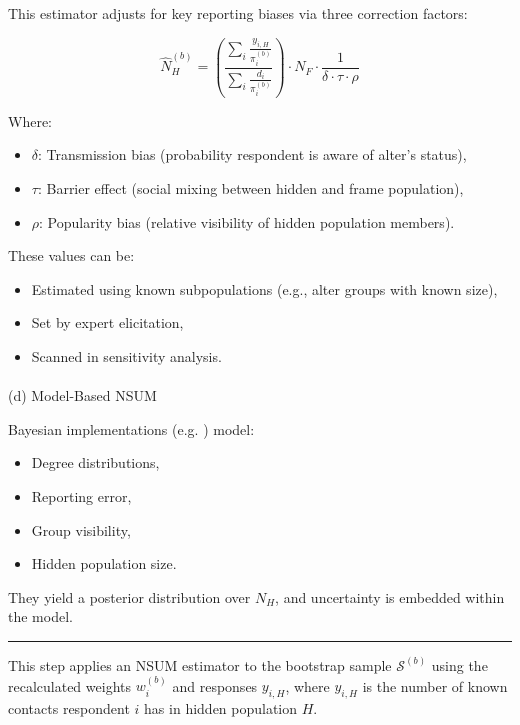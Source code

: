 \documentclass[
  12pt,
  letterpaper,
  DIV=11,
  numbers=noendperiod]{scrartcl}
\makeatletter
\let\oldparagraph\paragraph
\renewcommand{\paragraph}{
    \@ifstar
      \xxxParagraphStar
      \xxxParagraphNoStar
  }
\newcommand{\xxxParagraphStar}[1]{\oldparagraph*{#1}\mbox{}}
\newcommand{\xxxParagraphNoStar}[1]{\oldparagraph{#1}\mbox{}}
\theoremstyle{plain}
\theoremstyle{definition}
\makeatother
\begin{document}
This estimator adjusts for key reporting biases via three correction
factors:

\[\hat{N}_H^{(b)} = \left( \frac{\sum_{i} \frac{y_{i,H}}{\pi_i^{(b)}}}{\sum_{i} \frac{d_i}{\pi_i^{(b)}}} \right) \cdot N_F \cdot \frac{1}{\delta \cdot \tau \cdot \rho}\]

Where:

\begin{itemize}
\item
  \(\delta\): Transmission bias (probability respondent is aware of
  alter's status),
\item
  \(\tau\): Barrier effect (social mixing between hidden and frame
  population),
\item
  \(\rho\): Popularity bias (relative visibility of hidden population
  members).
\end{itemize}

These values can be:

\begin{itemize}
\item
  Estimated using known subpopulations (e.g., alter groups with known
  size),
\item
  Set by expert elicitation,
\item
  Scanned in sensitivity analysis.
\end{itemize}

\paragraph{(d) Model-Based NSUM}\label{d-model-based-nsum}

Bayesian implementations (e.g. \textcite{malt15-estimating}) model:

\begin{itemize}
\item
  Degree distributions,
\item
  Reporting error,
\item
  Group visibility,
\item
  Hidden population size.
\end{itemize}

They yield a posterior distribution over \(N_H\), and uncertainty is
embedded within the model.

\begin{center}\rule{0.5\linewidth}{0.5pt}\end{center}

This step applies an NSUM estimator to the bootstrap sample
\(\mathcal{S}^{(b)}\) using the recalculated weights \(w_i^{(b)}\) and
responses \(y_{i,H}\), where \(y_{i,H}\) is the number of known contacts
respondent \(i\) has in hidden population \(H\).
\end{document}
